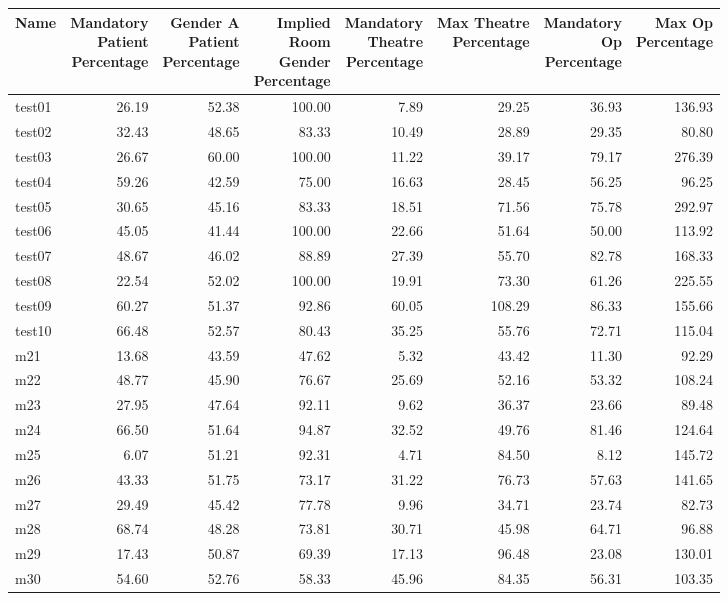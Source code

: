 {\scriptsize
\begin{tabular}{lrrrrrrr}\toprule
Name &\shortstack{Mandatory\\Patient\\Percentage} &\shortstack{Gender A\\Patient\\Percentage} &\shortstack{Implied\\Room\\Gender\\Percentage} &\shortstack{Mandatory\\Theatre\\Percentage} &\shortstack{Max Theatre\\Percentage} &\shortstack{Mandatory\\Op\\Percentage} &\shortstack{Max Op\\Percentage} \\ \midrule
test01&26.19&52.38&100.00& 7.89&29.25&36.93&136.93\\ 
test02&32.43&48.65&83.33&10.49&28.89&29.35&\cellcolor{red!10}80.80\\ 
test03&26.67&60.00&100.00&11.22&39.17&79.17&276.39\\ 
test04&59.26&42.59&75.00&16.63&28.45&56.25&96.25\\ 
test05&30.65&45.16&83.33&18.51&71.56&75.78&\cellcolor{red!10}292.97\\ 
test06&45.05&41.44&100.00&22.66&51.64&50.00&113.92\\ 
test07&48.67&46.02&88.89&27.39&55.70&82.78&168.33\\ 
test08&22.54&52.02&100.00&19.91&73.30&61.26&225.55\\ 
test09&60.27&51.37&92.86&60.05&\cellcolor{red!10}108.29&86.33&155.66\\ 
test10&66.48&52.57&80.43&35.25&55.76&72.71&115.04\\ 
m21&13.68&43.59&47.62& \cellcolor{red!10}5.32&43.42&11.30&92.29\\ 
m22&48.77&45.90&76.67&25.69&52.16&53.32&108.24\\ 
m23&27.95&47.64&92.11& 9.62&36.37&23.66&89.48\\ 
m24&66.50&51.64&94.87&32.52&49.76&81.46&124.64\\ 
m25&\cellcolor{red!10} 6.07&51.21&92.31& 4.71&84.50& 8.12&145.72\\ 
m26&43.33&51.75&73.17&31.22&76.73&57.63&141.65\\ 
m27&29.49&45.42&77.78& 9.96&34.71&23.74&82.73\\ 
m28&\cellcolor{red!10}68.74&48.28&73.81&30.71&45.98&64.71&96.88\\ 
m29&17.43&50.87&69.39&17.13&96.48&23.08&130.01\\ 
m30&54.60&52.76&58.33&45.96&84.35&56.31&103.35\\ 
\bottomrule
\end{tabular}
}